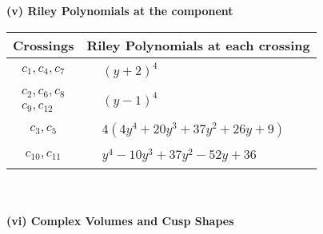 \documentclass[1p]{elsarticle_modified}
\theoremstyle{definition}
\begin{document}
\newpage\renewcommand{\arraystretch}{1}
\flushleft \textbf{(v) Riley Polynomials at the component}\newline \\
\begin{tabular}{m{50pt}|m{274pt}}
Crossings & \hspace{64pt}Riley Polynomials at each crossing \\
\hline $$\begin{aligned}c_{1},c_{4},c_{7}\end{aligned}$$&$\begin{aligned}
&(y+2)^4
\end{aligned}$\\
\hline $$\begin{aligned}c_{2},c_{6},c_{8}\\c_{9},c_{12}\end{aligned}$$&$\begin{aligned}
&(y-1)^4
\end{aligned}$\\
\hline $$\begin{aligned}c_{3},c_{5}\end{aligned}$$&$\begin{aligned}
&4(4 y^4+20 y^3+37 y^2+26 y+9)
\end{aligned}$\\
\hline $$\begin{aligned}c_{10},c_{11}\end{aligned}$$&$\begin{aligned}
&y^4-10 y^3+37 y^2-52 y+36
\end{aligned}$\\
\hline
\end{tabular}\\~\\
\newpage\flushleft \textbf{(vi) Complex Volumes and Cusp Shapes}
\end{document}
